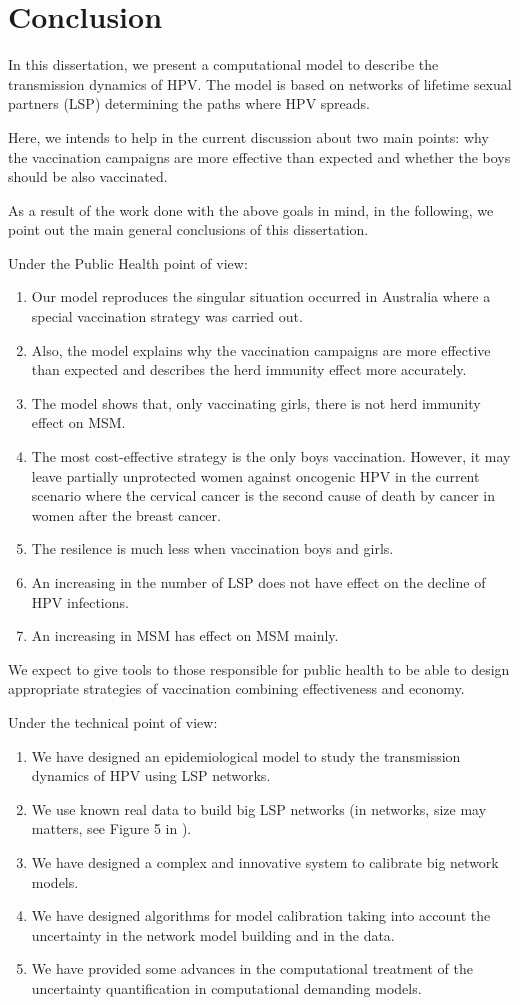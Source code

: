 \chapter{Conclusion}\label{conclusion}
In this dissertation, we present a computational model to describe the transmission dynamics of HPV. The model is based on networks of lifetime sexual partners (LSP) determining the paths where HPV spreads.

Here, we intends to help in the current discussion about two main points: why the vaccination campaigns are more effective than expected and whether the boys should be also vaccinated.  

As a result of the work done with the above goals in mind, in the following, we point out the main general conclusions of this dissertation.

Under the Public Health point of view:
\begin{enumerate}
	\item Our model reproduces the singular situation occurred in Australia where a special vaccination strategy was carried out.
	\item Also, the model explains why the vaccination campaigns are more effective than expected and describes the herd immunity effect more accurately.
	\item The model shows that, only vaccinating girls, there is not herd immunity effect on MSM.
	\item The most cost-effective strategy is the only boys vaccination. However, it may leave partially unprotected women against oncogenic HPV in the current scenario where the cervical cancer is the second cause of death by cancer in women after the breast cancer.
	\item The resilence is much less when vaccination boys and girls. 
	\item An increasing in the number of LSP does not have effect on the decline of HPV infections.
	\item An increasing in MSM has effect on MSM mainly.
\end{enumerate}

We expect to give tools to those responsible for public health to be able to design appropriate strategies of vaccination combining effectiveness and economy.

Under the technical point of view:
\begin{enumerate}
	\item We have designed an epidemiological model to study the transmission dynamics of HPV using LSP networks.
	\item We use known real data to build big LSP networks (in networks, size may matters, see Figure 5 in \cite{villanueva2013epidemic}).
	\item We have designed a complex and innovative system to calibrate big network models.
	\item We have designed algorithms for model calibration taking into account the uncertainty in the network model building and in the data. 
	\item We have provided some advances in the computational treatment of the uncertainty quantification in computational demanding models.
\end{enumerate}

